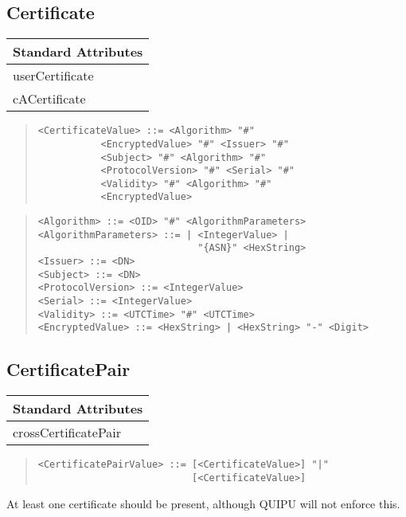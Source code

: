 \subsection{Certificate}
\begin{center}\small
\begin{tabular}{|l|}\hline
Standard Attributes \\ \hline
	userCertificate\\
	cACertificate\\
\hline
\end{tabular}
\end{center}


\begin{quote}\begin{verbatim}
<CertificateValue> ::= <Algorithm> "#" 
           <EncryptedValue> "#" <Issuer> "#" 
           <Subject> "#" <Algorithm> "#"
           <ProtocolVersion> "#" <Serial> "#" 
           <Validity> "#" <Algorithm> "#" 
           <EncryptedValue>
\end{verbatim}\end{quote}
\begin{quote}\begin{verbatim}
<Algorithm> ::= <OID> "#" <AlgorithmParameters>
<AlgorithmParameters> ::= | <IntegerValue> | 
                            "{ASN}" <HexString>
<Issuer> ::= <DN>
<Subject> ::= <DN>
<ProtocolVersion> ::= <IntegerValue>
<Serial> ::= <IntegerValue>
<Validity> ::= <UTCTime> "#" <UTCTime>
<EncryptedValue> ::= <HexString> | <HexString> "-" <Digit>
\end{verbatim}\end{quote}

\subsection{CertificatePair}
\begin{center}\small
\begin{tabular}{|l|}\hline
Standard Attributes \\ \hline
	crossCertificatePair\\
\hline
\end{tabular}
\end{center}

\begin{quote}\begin{verbatim}
<CertificatePairValue> ::= [<CertificateValue>] "|" 
                           [<CertificateValue>]
\end{verbatim}\end{quote}
At least one certificate should be present, although QUIPU will not enforce
this.

